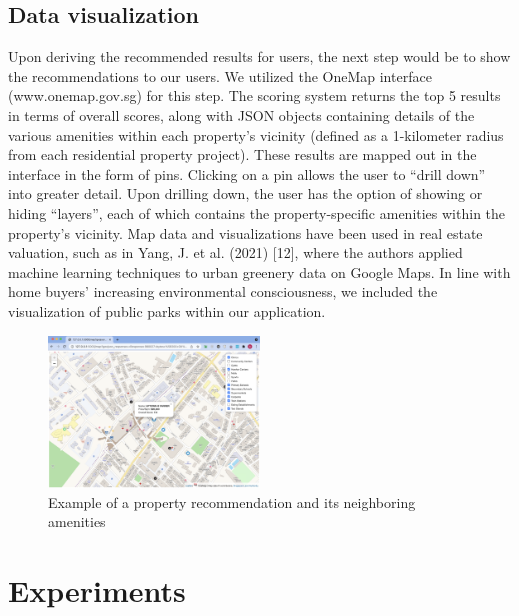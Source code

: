 \documentclass[a4paper, 11pt]{article}
\begin{document}
\subsection{Data visualization}

Upon deriving the recommended results for users, the next step would be to show the recommendations to our users. We utilized the OneMap interface (www.onemap.gov.sg) for this step. The scoring system returns the top 5 results in terms of overall scores, along with JSON objects containing details of the various amenities within each property's vicinity (defined as a 1-kilometer radius from each residential property project). These results are mapped out in the interface in the form of pins. Clicking on a pin allows the user to “drill down” into greater detail. Upon drilling down, the user has the option of showing or hiding “layers”, each of which contains the property-specific amenities within the property's vicinity. Map data and visualizations have been used in real estate valuation, such as in Yang, J. et al. (2021) [12], where the authors applied machine learning techniques to urban greenery data on Google Maps. In line with home buyers’ increasing environmental consciousness, we included the visualization of public parks within our application. 

   \begin{figure}[h]
   \centering
   \includegraphics[width={0.5\textwidth}]{map.png}
   \caption{Example of a property recommendation and its neighboring amenities}
   \end{figure}
    
\section{Experiments}
\end{document}
